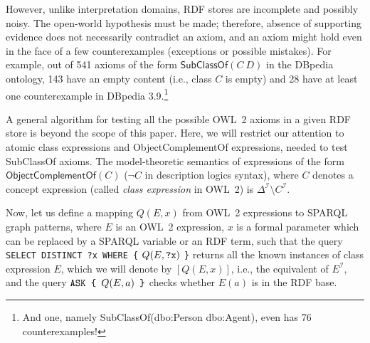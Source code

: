 \documentclass{llncs}
\begin{document}
However, unlike interpretation domains, RDF stores are incomplete and
possibly noisy. The open-world hypothesis must be made; therefore, absence of
supporting evidence does not necessarily contradict an axiom, and an axiom might
hold even in the face of a few counterexamples (exceptions or possible mistakes).
For example, out of 541 axioms of the form $\mathsf{SubClassOf}(C\ D)$ in the DBpedia
ontology, 143 have an empty content (i.e., class $C$ is empty)
and 28 have at least one counterexample in DBpedia 3.9.\footnote{And one, namely
\textsf{SubClassOf}(\textsf{dbo:Person} \textsf{dbo:Agent}), even has 76 counterexamples!}


A general algorithm for testing all the possible OWL~2 axioms in a given RDF store is beyond the scope of this paper. 
Here, we will restrict our attention to atomic class expressions and \textsf{ObjectComplementOf}
expressions, needed to test \textsf{SubClassOf} axioms.
The model-theoretic semantics of expressions of the form $\mathsf{ObjectComplementOf}(C)$
($\neg C$ in description logics syntax), where $C$ denotes a concept expression
(called \emph{class expression} in OWL~2) is $\Delta^\mathcal{I} \setminus C^\mathcal{I}$.


Now, let us define a mapping $Q(E, x)$ from OWL~2 expressions to SPARQL graph patterns,
where $E$ is an OWL~2 expression, $x$ is a formal parameter which can be replaced by
a SPARQL variable or an RDF term,
such that the query
\texttt{SELECT DISTINCT ?x WHERE \{} $Q(E, \mbox{\tt ?x})$ \texttt{\}}
returns all the known instances of class expression $E$, which we will denote by
$[Q(E, x)]$, i.e., the equivalent of $E^\mathcal{I}$,
and the query $\mbox{\tt ASK \{ } Q(E, a) \mbox{\tt\ \}}$ checks whether $E(a)$
is in the RDF base.
\end{document}
